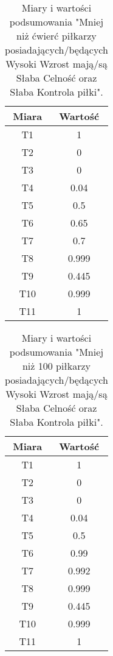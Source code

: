 \documentclass{classrep}
\begin{document}
\begin{table}[H]
	\centering
	\begin{tabular}{c c } 
		\hline
		\textbf{Miara} & \textbf{Wartość}\\ [0.5ex] 
		\hline
		\hline 
		T1 & 1  \\
		T2 & 0 \\
		T3 & 0  \\
		T4 & 0.04 \\
		T5 & 0.5  \\
		T6 & 0.65 \\
		T7 & 0.7  \\
		T8 & 0.999 \\
		T9 & 0.445  \\
		T10 & 0.999 \\
		T11 & 1 \\
		\hline
	\end{tabular}
	\caption{Miary i wartości podsumowania "Mniej niż ćwierć piłkarzy posiadających/będących Wysoki Wzrost mają/są Słaba Celność oraz Słaba Kontrola piłki".}
\end{table}

\begin{table}[H]
	\centering
	\begin{tabular}{c c } 
		\hline
		\textbf{Miara} & \textbf{Wartość}\\ [0.5ex] 
		\hline
		\hline 
		T1 & 1  \\
		T2 & 0 \\
		T3 & 0  \\
		T4 & 0.04 \\
		T5 & 0.5  \\
		T6 & 0.99 \\
		T7 & 0.992  \\
		T8 & 0.999 \\
		T9 & 0.445  \\
		T10 & 0.999 \\
		T11 & 1 \\
		\hline
	\end{tabular}
	\caption{Miary i wartości podsumowania "Mniej niż 100 piłkarzy posiadających/będących Wysoki Wzrost mają/są Słaba Celność oraz Słaba Kontrola piłki".}
\end{table}
\end{document}
